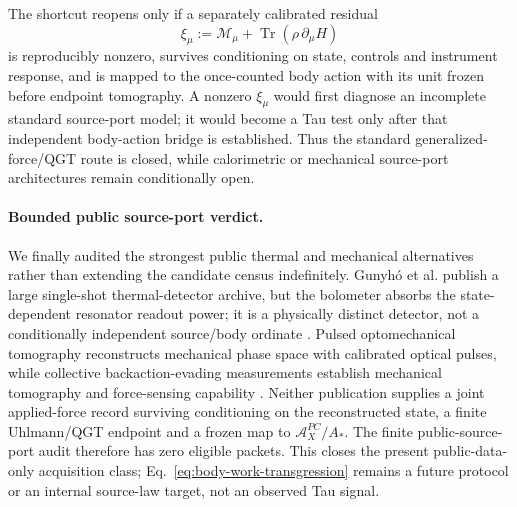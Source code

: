 The shortcut reopens only if a separately calibrated residual
\begin{equation}
 \xi_\mu:=\mathcal M_\mu+
 \operatorname{Tr}\!\left(\rho\,\partial_\mu H\right)
 \label{eq:source-port-force-residual}
\end{equation}
is reproducibly nonzero, survives conditioning on state, controls and
instrument response, and is mapped to the once-counted body action with its
unit frozen before endpoint tomography.  A nonzero $\xi_\mu$ would first
diagnose an incomplete standard source-port model; it would become a Tau test
only after that independent body-action bridge is established.  Thus the
standard generalized-force/QGT route is closed, while calorimetric or
mechanical source-port architectures remain conditionally open.

\paragraph{Bounded public source-port verdict.}
We finally audited the strongest public thermal and mechanical alternatives
rather than extending the candidate census indefinitely.  Gunyh\'o et al.
publish a large single-shot thermal-detector archive, but the bolometer absorbs
the state-dependent resonator readout power; it is a physically distinct
detector, not a conditionally independent source/body ordinate
\citep{Gunyho2024ThermalReadout}.  Pulsed optomechanical tomography reconstructs
mechanical phase space with calibrated optical pulses, while collective
backaction-evading measurements establish mechanical tomography and
force-sensing capability \citep{Vanner2013MechanicalTomography,
OckeloenKorppi2016BAE}.  Neither publication supplies a joint applied-force
record surviving conditioning on the reconstructed state, a finite
Uhlmann/QGT endpoint and a frozen map to $\mathcal A_X^{PC}/A_*$.  The finite
public-source-port audit therefore has zero eligible packets.  This closes the
present public-data-only acquisition class; Eq.~\eqref{eq:body-work-transgression}
remains a future protocol or an internal source-law target, not an observed Tau
signal.

